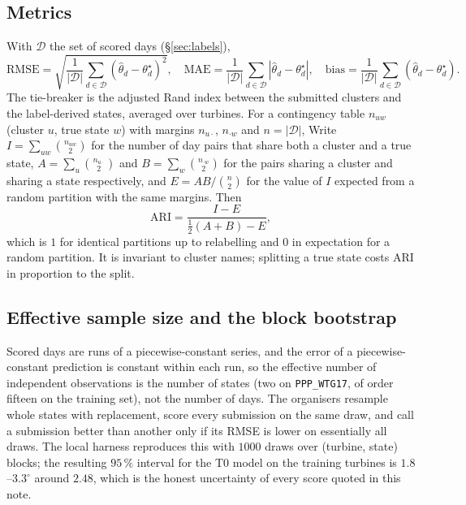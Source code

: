 \documentclass[11pt,a4paper]{article}
\theoremstyle{remark}
\newcommand{\dg}{^{\circ}}
\newcommand{\code}[1]{\texttt{#1}}
\begin{document}
\subsection{Metrics}
With $\mathcal D$ the set of scored days (\S\ref{sec:labels}),
\begin{equation}
  \mathrm{RMSE} = \sqrt{\frac1{|\mathcal D|}\sum_{d\in\mathcal D}(\hat\theta_d-\theta^\star_d)^2},\quad
  \mathrm{MAE} = \frac1{|\mathcal D|}\sum_{d\in\mathcal D}|\hat\theta_d-\theta^\star_d|,\quad
  \mathrm{bias} = \frac1{|\mathcal D|}\sum_{d\in\mathcal D}(\hat\theta_d-\theta^\star_d).
\end{equation}
The tie-breaker is the adjusted Rand index between the submitted clusters and
the label-derived states, averaged over turbines. For a contingency table
$n_{uw}$ (cluster $u$, true state $w$) with margins $n_{u\cdot}$, $n_{\cdot w}$
and $n=|\mathcal D|$,
Write $I=\sum_{uw}\binom{n_{uw}}{2}$ for the number of day pairs that
share both a cluster and a true state, $A=\sum_u\binom{n_{u\cdot}}{2}$ and
$B=\sum_w\binom{n_{\cdot w}}{2}$ for the pairs sharing a cluster and sharing a
state respectively, and $E=AB/\binom n2$ for the value of $I$ expected from a
random partition with the same margins. Then
\begin{equation}
  \mathrm{ARI} = \frac{I - E}{\tfrac12(A+B) - E},
\end{equation}
which is $1$ for identical partitions up to relabelling and $0$ in expectation
for a random partition. It is invariant to cluster names; splitting a true state
costs ARI in proportion to the split.

\subsection{Effective sample size and the block bootstrap}
Scored days are runs of a piecewise-constant series, and the error of a
piecewise-constant prediction is constant within each run, so the effective
number of independent observations is the number of states (two on
\code{PPP\_WTG17}, of order fifteen on the training set), not the number of
days. The organisers resample whole states with replacement, score every
submission on the same draw, and call a submission better than another only if
its RMSE is lower on essentially all draws. The local harness reproduces this
with $1000$ draws over (turbine, state) blocks; the resulting $95\,\%$ interval
for the T0 model on the training turbines is $1.8$--$3.3\dg$ around $2.48$,
which is the honest uncertainty of every score quoted in this note.
\end{document}
